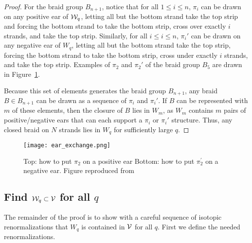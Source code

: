 \documentclass[paper.tex]{subfiles}
\begin{document}
\begin{proof}

    For the braid group $B_{n+1}$, notice that for all $1 \leq i \leq n$, $\pi_i$ can be drawn on any positive ear of $\mathcal{W}_q$, letting all but the bottom strand take the top strip and forcing the bottom strand to take the bottom strip, cross over exactly $i$ strands, and take the top strip. Similarly, for all $i \leq i \leq n$, $\pi_i'$ can be drawn on any negative ear of $W_q$, letting all but the bottom strand take the top strip, forcing the bottom strand to take the bottom strip, cross under exactly $i$ strands, and take the top strip. Examples of $\pi_2$ and $\pi_2'$ of the braid group $B_5$ are drawn in Figure~\ref{fig:earexchange}.

    Because this set of elements generates the braid group $B_{n+1}$, any braid $B \in B_{n+1}$ can be drawn as a sequence of $\pi_i$ and $\pi_i'$. If $B$ can be represented with $m$ of these elements, then the closure of $B$ lies in $W_m$, as $W_m$ contains $m$ pairs of positive/negative ears that can each support a $\pi_i$ or $\pi_i'$ structure. Thus, any closed braid on $N$ strands lies in $W_q$ for sufficiently large $q$.

\end{proof}



\begin{figure}[h]
  \centering
  \texttt{[image: ear\_exchange.png]}
  \caption{Top: how to put $\pi_2$ on a positive ear Bottom: how to put $\pi_2^\prime$ on a negative ear. Figure reproduced from~\cite{Ghrist1996}}\label{fig:earexchange}
\end{figure}






\subsection{Find $\mathcal{W}_q \subset \mathcal{V}$ for all $q$}

The remainder of the proof is to show with a careful sequence of isotopic renormalizations that $W_q$ is contained in $\mathcal{V}$ for all $q$. First we define the needed renormalizations.
\end{document}
